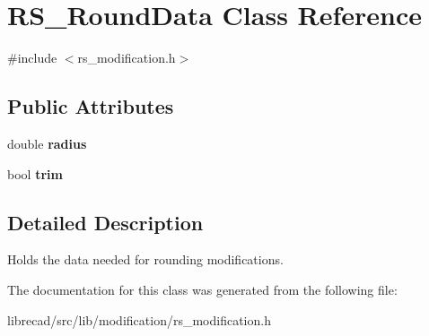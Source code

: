 \hypertarget{classRS__RoundData}{\section{R\-S\-\_\-\-Round\-Data Class Reference}
\label{classRS__RoundData}
}


{\ttfamily \#include $<$rs\-\_\-modification.\-h$>$}

\subsection*{Public Attributes}
\begin{DoxyCompactItemize}
\item 
\hypertarget{classRS__RoundData_a9ac907a5fe45c2b9211b3943ac4b1780}{double {\bfseries radius}}\label{classRS__RoundData_a9ac907a5fe45c2b9211b3943ac4b1780}

\item 
\hypertarget{classRS__RoundData_a684c3422e9c7ff6ae0ff5db720a25668}{bool {\bfseries trim}}\label{classRS__RoundData_a684c3422e9c7ff6ae0ff5db720a25668}

\end{DoxyCompactItemize}


\subsection{Detailed Description}
Holds the data needed for rounding modifications. 

The documentation for this class was generated from the following file\-:\begin{DoxyCompactItemize}
\item 
librecad/src/lib/modification/rs\-\_\-modification.\-h\end{DoxyCompactItemize}
